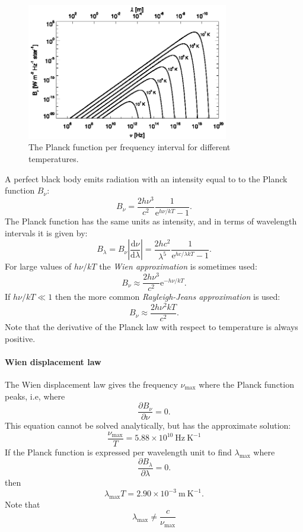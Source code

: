 \documentclass[12pt]{article}
\numberwithin{equation}{section}
\def\exp{\mathrm{e}}
\def\dd{\mathrm{d}}
\def\Bnu{\ensuremath{B_{\nu}}}
\def\Plancknu{\ensuremath{ \frac{2 h \nu^3}{c^2} \frac{1}{\exp^{h \nu / kT} -1}}}
\def\Planckla{\ensuremath{ \frac{2 h c^2}{\lambda^5} \frac{1}{\exp^{h c / \lambda kT} -1}}}
\def\Bla{\ensuremath{B_{\lambda}}}
\newcommand{\be}{\begin{equation}}
\newcommand{\ee}{\end{equation}}
\begin{document}
\begin{figure}
  \centering
  \includegraphics[width=8.8cm]{figs/Bnu}
  \caption{The Planck function per frequency interval for different temperatures.
  \label{fig:Bnu_def}}
\end{figure}

A perfect black body emits radiation with an intensity equal to to the Planck function \Bnu:
\be
\Bnu = \Plancknu.
\ee
The Planck function has the same units as intensity, and in terms of wavelength intervals it is given by:
\be
\Bla = \Bnu \left| \frac{\dd \nu}{\dd \lambda} \right| = \Planckla.
\ee
For large values of $h \nu / kT$ the {\it Wien approximation} is sometimes used:
\be
\Bnu \approx \frac{2 h \nu^3}{c^2} \exp^{-h \nu / kT}.
\ee
If $h \nu / kT \ll 1$ then the more common  {\it Rayleigh-Jeans approximation}  is used:
\be
\Bnu \approx \frac{2 h \nu^2 k T}{c^2}.
\ee
Note that the derivative of the Planck law with respect to temperature is always positive.

\paragraph{Wien displacement law} 
The Wien displacement law gives the frequency $\nu_\mathrm{max}$ where the Planck function peaks, i.e, where
\be
\frac{\partial \Bnu}{\partial \nu} = 0.
\ee
This equation cannot be solved analytically, but has the approximate solution:
\be
\frac{\nu_\mathrm{max}}{T} = 5.88 \times 10^{10} \ \mathrm{Hz}\ \mathrm{K}^{-1}
\ee
If the Planck function is expressed per wavelength unit to find $\lambda_\mathrm{max}$ where 
\be
\frac{\partial \Bla}{\partial \lambda} = 0.
\ee
then
\be
\lambda_\mathrm{max} T = 2.90 \times 10^{-3} \ \mathrm{m}\ \mathrm{K}^{-1}.
\ee
Note that 
\be
\lambda_\mathrm{max} \ne \frac{c}{\nu_\mathrm{max} }
\ee
\end{document}
